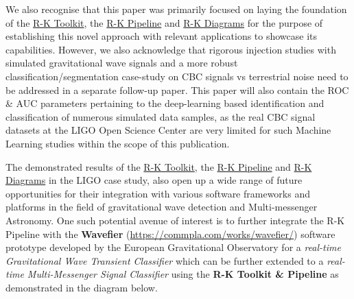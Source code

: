 We also recognise that this paper was primarily focused on laying the foundation of the \hyperref[subsec:R-K Toolkit]{R-K Toolkit}, the \hyperref[subsec:R-K Pipeline]{R-K Pipeline} and \hyperref[subsec:R-K Diagram]{R-K Diagrams} for the purpose of establishing this novel approach with relevant applications to showcase its capabilities. However, we also acknowledge that rigorous injection studies with simulated gravitational wave signals and a more robust classification/segmentation case-study on CBC signals vs terrestrial noise need to be addressed in a separate follow-up paper. This paper will also contain the ROC \& AUC parameters pertaining to the deep-learning based identification  and classification of numerous simulated data samples, as the real CBC signal datasets at the LIGO Open Science Center \cite{00_LIGOOpenSciData} are very limited for such Machine Learning studies within the scope of this publication.

The demonstrated results of the \hyperref[subsec:R-K Toolkit]{R-K Toolkit}, the \hyperref[subsec:R-K Pipeline]{R-K Pipeline} and \hyperref[subsec:R-K Diagram]{R-K Diagrams} in the LIGO case study, also open up a wide range of future opportunities for their integration with various software frameworks and platforms in the field of gravitational wave detection and Multi-messenger Astronomy. One such potential avenue of interest is to further integrate the R-K Pipeline with the \textbf{Wavefier} (\hyperlink{website}{https://commpla.com/works/wavefier/}) software prototype developed by the European Gravitational Observatory for a \textit{real-time Gravitational Wave Transient Classifier} which can be further extended to a \textit{real-time Multi-Messenger Signal Classifier} using the \textbf{R-K Toolkit \& Pipeline} as demonstrated in the diagram below.\cite{25.7_cuoco2022Wavefier}

